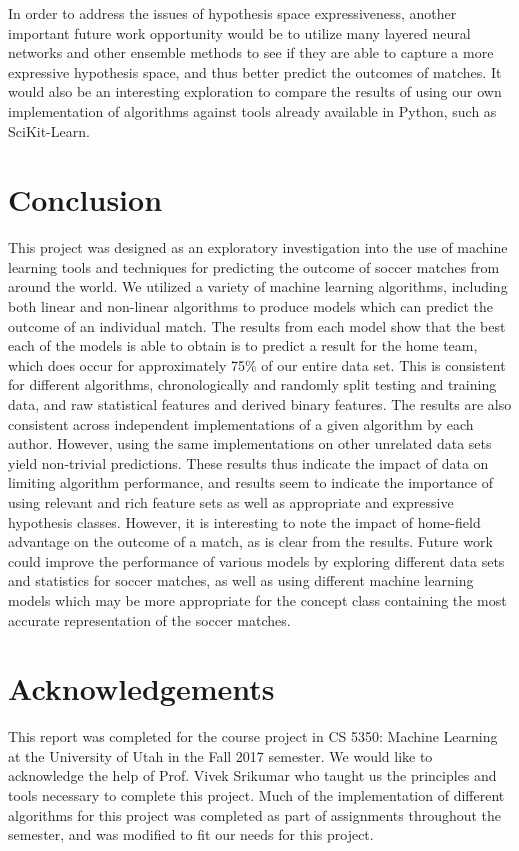 In order to address the issues of hypothesis space expressiveness, another important future work opportunity would be to utilize many layered neural networks and other ensemble methods to see if they are able to capture a more expressive hypothesis space, and thus better predict the outcomes of matches. It would also be an interesting exploration to compare the results of using our own implementation of algorithms against tools already available in Python, such as SciKit-Learn.

\section{Conclusion}
This project was designed as an exploratory investigation into the use of machine learning tools and techniques for predicting the outcome of soccer matches from around the world. We utilized a variety of machine learning algorithms, including both linear and non-linear algorithms to produce models which can predict the outcome of an individual match. The results from each model show that the best each of the models is able to obtain is to predict a result for the home team, which does occur for approximately 75\% of our entire data set. This is consistent for different algorithms, chronologically and randomly split testing and training data, and raw statistical features and derived binary features. The results are also consistent across independent implementations of a given algorithm by each author. However, using the same implementations on other unrelated data sets yield non-trivial predictions. These results thus indicate the impact of data on limiting algorithm performance, and results seem to indicate the importance of using relevant and rich feature sets as well as appropriate and expressive hypothesis classes. However, it is interesting to note the impact of home-field advantage on the outcome of a match, as is clear from the results. Future work could improve the performance of various models by exploring different data sets and statistics for soccer matches, as well as using different machine learning models which may be more appropriate for the concept class containing the most accurate representation of the soccer matches. 

\section*{Acknowledgements}
This report was completed for the course project in CS 5350: Machine Learning at the University of Utah in the Fall 2017 semester. We would like to acknowledge the help of Prof. Vivek Srikumar who taught us the principles and tools necessary to complete this project. Much of the implementation of different algorithms for this project was completed as part of assignments throughout the semester, and was modified to fit our needs for this project.